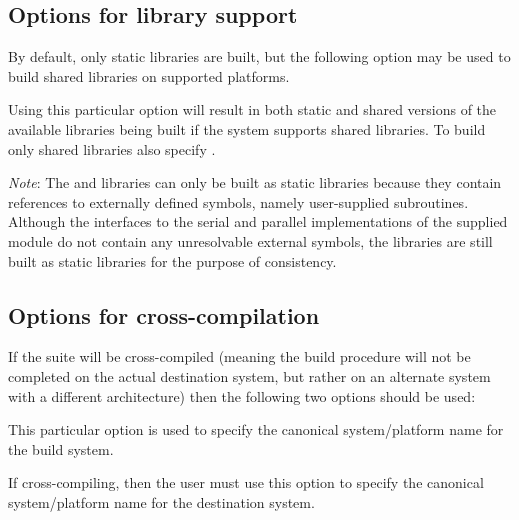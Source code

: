 \subsection*{Options for library support}

\noindent By default, only static libraries are built, but the following option
may be used to build shared libraries on supported platforms.

\begin{config}

\item {}

  Using this particular option will result in both static and shared versions
  of the available {\sundials} libraries being built if the system supports
  shared libraries. To build only shared libraries also specify .

  {\em Note}: The {\fcvode} and {\fkinsol} libraries can only be built as static
  libraries because they contain references to externally defined symbols, namely
  user-supplied {\F} subroutines.  Although the {\F} interfaces to the serial and
  parallel implementations of the supplied {\nvector} module do not contain any
  unresolvable external symbols, the libraries are still built as static libraries
  for the purpose of consistency.

\end{config}

\subsection*{Options for cross-compilation}


\noindent If the {\sundials} suite will be cross-compiled (meaning the build
procedure will not be completed on the actual destination system, but rather
on an alternate system with a different architecture) then the following two
options should be used:

\begin{config}

\item {}

  This particular option is used to specify the canonical system/platform name
  for the build system.

\item {}

  If cross-compiling, then the user must use this option to specify the canonical
  system/platform name for the destination system.

\end{config}

